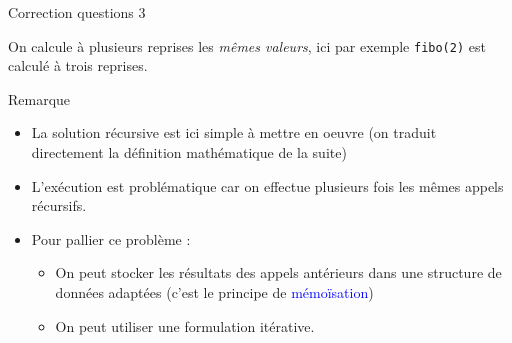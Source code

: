 \documentclass[10pt]{beamer}
\begin{document}
\begin{frame}{\Ctitle}{\stitle}
	\begin{exampleblock}{Correction questions 3}
		\begin{center}
		\end{center} \medskip
		{\small On calcule à plusieurs reprises les \textit{mêmes valeurs}, ici par exemple \textcolor{BrickRed}{\tt fibo(2)} est calculé à trois reprises.}
	\end{exampleblock}
\end{frame}

\begin{frame}[fragile]{\Ctitle}{\stitle}
	\begin{block}{Remarque}
	\begin{itemize}
		\item<1-> La solution récursive est ici simple à mettre en oeuvre (on traduit directement la définition mathématique de la suite)
		\item<2-> L'exécution est problématique car on effectue plusieurs fois les mêmes appels récursifs.
		\item<3-> Pour pallier ce problème :
		\begin{itemize}
			\item<4-> On peut stocker les résultats des appels antérieurs dans une structure de données adaptées (c'est le principe de \textcolor{blue}{mémoïsation})
			\item<5-> On peut utiliser une formulation itérative.
		\end{itemize}
	\end{itemize}
\end{block}
\end{frame}
\end{document}
